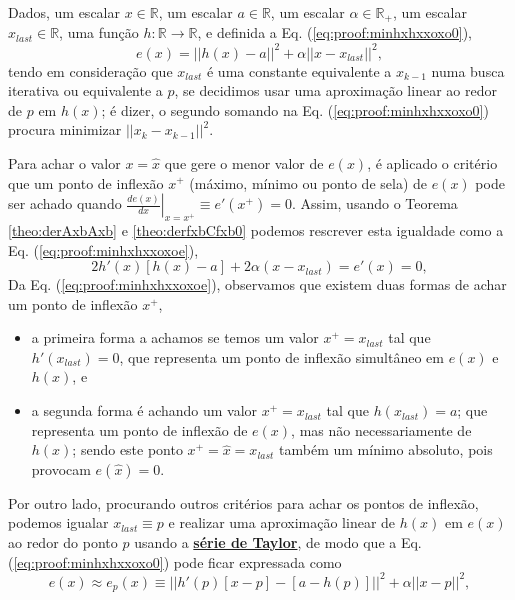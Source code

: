\begin{myproofT}\label{proof:theo:minhxhxaxoxo}

Dados,
um escalar $x \in \mathbb{R}$, 
um escalar $a \in \mathbb{R}$,
um escalar $\alpha \in \mathbb{R}_{+}$,
um escalar $x_{last} \in \mathbb{R}$,
uma função $h:\mathbb{R} \rightarrow \mathbb{R}$, e 
definida a Eq. (\ref{eq:proof:minhxhxxoxo0}),
\begin{equation}\label{eq:proof:minhxhxxoxo0}
e(x)=||h(x)-a||^2+\alpha ||x-x_{last}||^2,
\end{equation}
tendo em consideração que $x_{last}$ é uma constante equivalente a $x_{k-1}$
numa busca iterativa ou equivalente a $p$, 
se decidimos usar uma aproximação linear ao redor de $p$ em $h(x)$; 
é dizer, o segundo somando na Eq. (\ref{eq:proof:minhxhxxoxo0}) 
procura minimizar $||x_{k}-x_{k-1}||^2$.


Para achar o valor  $x=\hat{x}$ que gere o menor valor de $e(x)$, é aplicado
o critério que um ponto de inflexão $x^+$ (máximo, mínimo ou ponto de sela) de $e(x)$ 
pode ser achado quando 
$\left. \frac{d e(x)}{d x }\right|_{x=x^+} \equiv e'(x^+) =0$.
Assim, 
usando o Teorema \ref{theo:derAxbAxb} e \ref{theo:derfxbCfxb0} podemos 
rescrever esta igualdade como a Eq. (\ref{eq:proof:minhxhxxoxoe}),
\begin{equation}\label{eq:proof:minhxhxxoxoe}
2  h'(x) \left[h(x) -a\right]+2\alpha (x-x_{last})= e'(x)=0,
\end{equation}
Da Eq. (\ref{eq:proof:minhxhxxoxoe}), observamos 
que existem duas formas de achar um ponto de inflexão $x^+$,
\begin{itemize}
 \item a primeira forma a achamos se temos um valor $x^+=x_{last}$ tal que $h'(x_{last})=0$, 
que representa um ponto de inflexão simultâneo em $e(x)$ e $h(x)$, e
 \item a segunda forma é achando um valor $x^+=x_{last}$ tal que $h(x_{last})=a$;
que representa um ponto de inflexão de $e(x)$, mas não
necessariamente de $h(x)$; 
sendo este ponto $x^+=\hat{x}=x_{last}$ também um mínimo absoluto, pois provocam $e(\hat{x})=0$.
\end{itemize}

Por outro lado, procurando outros critérios para achar os pontos de inflexão,
podemos igualar $x_{last}\equiv p$ e 
realizar uma aproximação linear de $h(x)$ em $e(x)$
ao redor do ponto $p$ usando a \hyperref[def:taylor]{\textbf{série de Taylor}},
de modo que a Eq. (\ref{eq:proof:minhxhxxoxo0}) pode ficar expressada como
\begin{equation}\label{eq:proof:minhxhxxoxo0approx}
e(x) \approx e_{p}(x)  \equiv ||h'(p)[x-p]-[a-h(p)]||^2+\alpha||x-p||^2,
\end{equation}



\end{myproofT}
